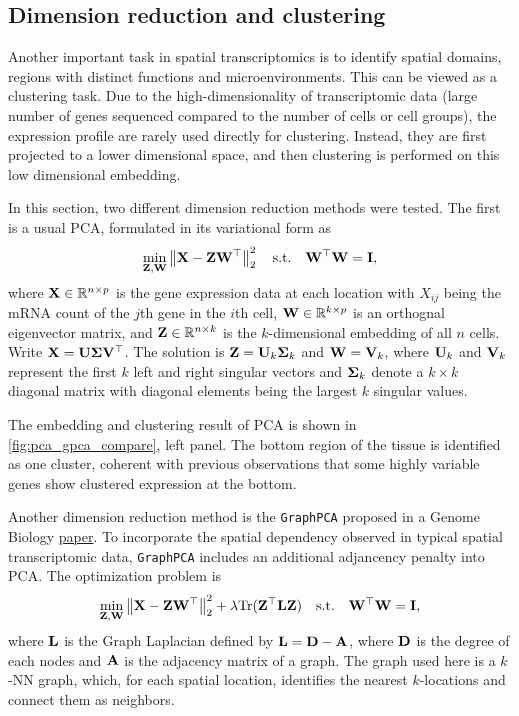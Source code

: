 \documentclass[11pt,oneside]{article}
\newcommand{\R}{\mathbb{R}}
\newcommand{\mat}[1]{
  \ifcat\noexpand#1\relax
    \bm{#1}
  \else
    \mathbf{#1}
  \fi
}
\newcommand{\norm}[1]{\left\lVert#1\right\rVert}
\newcommand{\tr}{\text{Tr}}
\begin{document}
\subsection{Dimension reduction and clustering}

Another important task in spatial transcriptomics is to identify spatial domains, regions with distinct functions and microenvironments. This can be viewed as a clustering task. Due to the high-dimensionality of transcriptomic data (large number of genes sequenced compared to the number of cells or cell groups), the expression profile are rarely used directly for clustering. Instead, they are first projected to a lower dimensional space, and then clustering is performed on this low dimensional embedding.

In this section, two different dimension reduction methods were tested. The first is a usual PCA, formulated in its variational form as
\begin{equation*}
\min_{\mat Z, \mat W}\norm{\mat X - \mat Z\mat W^\top}_2^2\quad\text{s.t.}\quad \mat W^\top\mat W = \mat I,
\end{equation*}
where $\mat X \in \R^{n\times p}$ is the gene expression data at each location with $X_{ij}$ being the mRNA count of the $j$th gene in the $i$th cell, $\mat W \in \R^{k\times p}$ is an orthognal eigenvector matrix, and $\mat Z \in \R^{n\times k}$ is the $k$-dimensional embedding of all $n$ cells. Write $\mat X = \mat U\mat\Sigma\mat V^\top$. The solution is $\mat Z = \mat U_k\mat \Sigma_k$ and $\mat W = \mat V_k$, where $\mat U_k$ and $\mat V_k$ represent the first $k$ left and right singular vectors and $\mat \Sigma_k$ denote a $k\times k$ diagonal matrix with diagonal elements being the largest $k$ singular values.

The embedding and clustering result of PCA is shown in \autoref{fig:pca_gpca_compare}, left panel. The bottom region of the tissue is identified as one cluster, coherent with previous observations that some highly variable genes show clustered expression at the bottom.

Another dimension reduction method is the \texttt{GraphPCA} proposed in a Genome Biology \href{https://genomebiology.biomedcentral.com/articles/10.1186/s13059-024-03429-x}{paper}. To incorporate the spatial dependency observed in typical spatial transcriptomic data, \texttt{GraphPCA} includes an additional adjancency penalty into PCA. The optimization problem is
\begin{equation*}
\min_{\mat Z, \mat W} \norm{\mat X - \mat Z\mat W^\top}_2^2 + \lambda\tr(\mat Z^\top\mat L\mat Z)\quad\text{s.t.}\quad \mat W^\top\mat W = \mat I,
\end{equation*}
where $\mat L$ is the Graph Laplacian defined by $\mat L = \mat D - \mat A$, where $\mat D$ is the degree of each nodes and $\mat A$ is the adjacency matrix of a graph. The graph used here is a $k$-NN graph, which, for each spatial location, identifies the nearest $k$-locations and connect them as neighbors.
\end{document}
